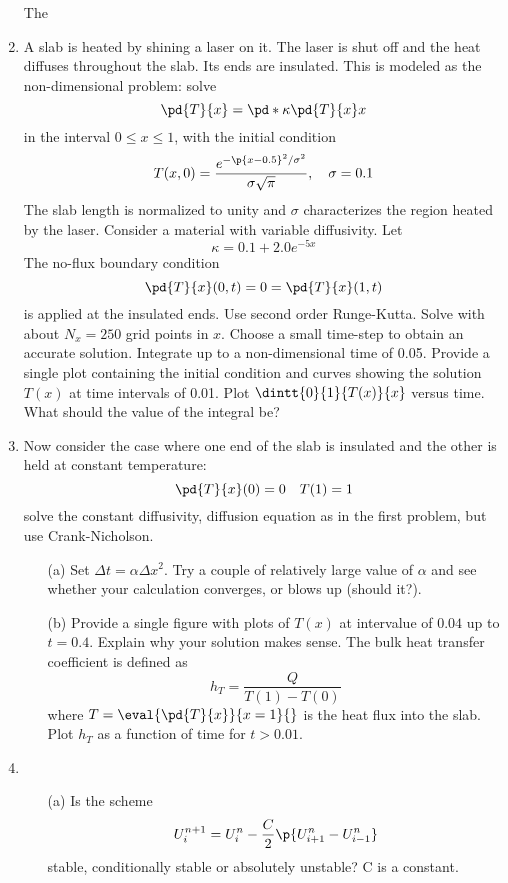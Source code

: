 \documentclass[11pt, oneside]{article}
\begin{document}
\begin{enumerate}
    The 

  \item %
    A slab is heated by shining a laser on it.
    The laser is shut off and the heat diffuses throughout the slab.
    Its ends are insulated.
    This is modeled as the non-dimensional problem: solve
    \[
      \pd{T}{x} = \pd*{\kappa \pd{T}{x}}{x}
    \]
    in the interval $0 \le x \le 1$, with the initial condition
    \[
      T(x, 0) = \frac{e^{-\p{x - 0.5}^2/\sigma^2}}{\sigma \sqrt{\pi}}, \quad \sigma = 0.1
    \]
    The slab length is normalized to unity and $\sigma$ characterizes the
    region heated by the laser.
    Consider a material with variable diffusivity.
    Let
    \[
      \kappa = 0.1 + 2.0 e^{-5x}
    \]
    The no-flux boundary condition
    \[
      \pd{T}{x}(0, t) = 0 = \pd{T}{x}(1, t)
    \]
    is applied at the insulated ends.
    Use second order Runge-Kutta.
    Solve with about $N_x = 250$ grid points in $x$.
    Choose a small time-step to obtain an accurate solution.
    Integrate up to a non-dimensional time of 0.05.
    Provide a single plot containing the initial condition and curves showing
    the solution $T(x)$ at time intervals of 0.01.
    Plot $\dintt{0}{1}{T(x)}{x}$ versus time.
    What should the value of the integral be?

  \item %
    Now consider the case where one end of the slab is insulated and the other
    is held at constant temperature:
    \[
      \pd{T}{x}(0) = 0 \quad T(1) = 1
    \]
    solve the constant diffusivity, diffusion equation as in the first problem,
    but use Crank-Nicholson.
    \begin{enumerate}
      \item[(a)]
        Set $\Delta t = \alpha \Delta x^2$.
        Try a couple of relatively large value of $\alpha$ and see whether your
        calculation converges, or blows up (should it?).

      \item[(b)]
        Provide a single figure with plots of $T(x)$ at intervalue of $0.04$ up to $t = 0.4$.
        Explain why your solution makes sense.
        The bulk heat transfer coefficient is defined as
        \[
          h_T = \frac{Q}{T(1) - T(0)}
        \]
        where $T = \eval{\pd{T}{x}}{x = 1}{}$ is the heat flux into the slab.
        Plot $h_T$ as a function of time for $t > 0.01$.
    \end{enumerate}

  \item %
    \begin{enumerate}
      \item[(a)]
        Is the scheme
        \[
          U_i^{n+1} = U_i^n - \frac{C}{2} \p{U_{i+1}^n - U_{i-1}^n}
        \]
        stable, conditionally stable or absolutely unstable?
        C is a constant.


\end{enumerate}
\end{enumerate}
\end{document}
